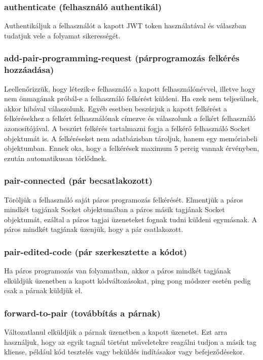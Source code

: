 \documentclass{elteikthesis}
\begin{document}
				\subsubsection{authenticate (felhasználó authentikál)}
					Authentikáljuk a felhasználót a kapott JWT token használatával és válaszban tudatjuk vele a folyamat sikerességét.

				\subsubsection{add-pair-programming-request (párprogramozás felkérés hozzáadása)}
					Leellenőrizzük, hogy létezik-e felhasználó a kapott felhasználónévvel, illetve hogy nem önmagának próbál-e a felhasználó felkérést küldeni. Ha ezek nem teljesülnek, akkor hibával válaszolunk. Egyéb esetben beszúrjuk a kapott felkérést a felkérésekhez a felkért felhasználónak címezve és válaszolunk a felkért felhasználó azonosítójával. A beszúrt felkérés tartalmazni fogja a felkérő felhasználó Socket objektumát is. A felkéréseket nem adatbázisban tároljuk, hanem egy memóriabeli objektumban. Ennek oka, hogy a felkérések maximum 5 percig vannak érvényben, ezután automatikusan törlődnek.

				\subsubsection{pair-connected (pár becsatlakozott)}
					Töröljük a felhasználó saját páros programozás felkérését. Elmentjük a páros mindkét tagjának Socket objektumában a páros másik tagjának Socket objektumát, ezáltal a páros tagjai üzeneteket fognak tudni küldeni egymásnak. A páros mindkét tagjának üzenjük, hogy a pár csatlakozott.

				\subsubsection{pair-edited-code (pár szerkesztette a kódot)}
					Ha páros programozás van folyamatban, akkor a páros mindkét tagjának elküldjük üzenetben a kapott kódváltozásokat, ping pong módszer esetén pedig csak a párnak küldjük el.

				\subsubsection{forward-to-pair (továbbítás a párnak)}
					Változatlanul elküldjük a párnak üzenetben a kapott üzenetet. Ezt arra használjuk, hogy az egyik tagnál történt műveletekre reagálni tudjon a másik tag kliense, például kód tesztelés vagy beküldés indításakor vagy befejeződésekor.
\end{document}
